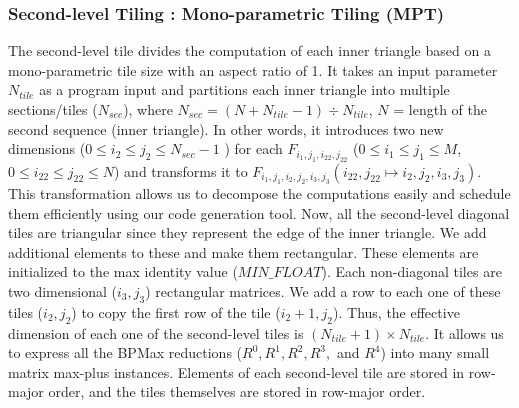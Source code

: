 \subsubsection{Second-level Tiling : Mono-parametric Tiling (\textbf{MPT})}
The second-level tile divides the computation of each inner triangle based on a mono-parametric tile size with an aspect ratio of 1.  It takes an input parameter $N_{tile}$ as a program input and partitions each inner triangle into multiple sections/tiles ($N_{sec}$), where $N_{sec} =(N+N_{tile}-1) \div N_{tile}$,  $N$  = length of the second sequence (inner triangle). In other words, it introduces two new dimensions ($0 \le i_{2} \le j_{2} \le N_{sec}-1$ ) for each $F_{i_{1}, j_{1}, i_{22}, j_{22}}$ ($0 \le i_{1} \le j_{1} \le M$, $0 \le i_{22} \le j_{22} \le N$) and transforms it to $F_{i_{1}, j_{1}, i_{2}, j_{2}, i_{3}, j_{3}} (i_{22}, j_{22} \mapsto i_{2}, j_{2}, i_{3}, j_{3})$. This transformation allows us to decompose the computations easily and schedule them efficiently using our code generation tool. Now, all the second-level diagonal tiles are triangular since they represent the edge of the inner triangle. We add additional elements to these and make them rectangular. These elements are initialized to the max identity value ($MIN\_FLOAT$). Each non-diagonal tiles are two dimensional ($i_{3}, j_{3}$) rectangular matrices. We add a row to each one of these tiles ($i_{2}, j_{2}$) to copy the first row of the tile ($i_{2}+1, j_{2}$). Thus, the effective dimension of each one of the second-level tiles is $(N_{tile} +1) \times  N_{tile}$. It allows us to express all the BPMax reductions ($R^{0}, R^{1}, R^{2}, R^{3},$ and $R^{4}$) into many small matrix max-plus instances. Elements of each second-level tile are stored in row-major order, and the tiles themselves are stored in row-major order.

